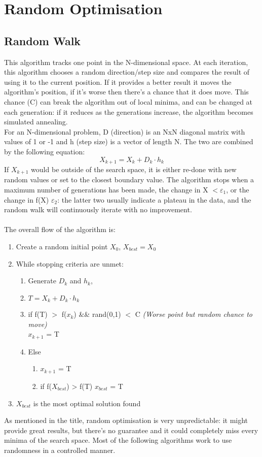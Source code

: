  \newpage
\section{Random Optimisation}

\subsection{Random Walk}
This algorithm tracks one point in the N-dimensional space. At each iteration, this algorithm chooses a random direction/step size and compares the result of using it to the current position. If it provides a better result it moves the algorithm's position, if it's worse then there's a chance that it does move. This chance (C) can break the algorithm out of local minima, and can be changed at each generation: if it reduces as the generations increase, the algorithm becomes simulated annealing. \\

For an N-dimensional problem, D (direction) is an NxN diagonal matrix with values of 1 or -1 and h (step size) is a vector of length N. The two are combined by the following equation:
\begin{equation}
    X_{k+1} = X_k + D_k \cdot h_k
\end{equation}
If $X_{k+1}$ would be outside of the search space, it is either re-done with new random values or set to the closest boundary value. The algorithm stops when a maximum number of generations has been made, the change in X $< \varepsilon_1$, or the change in f(X) $\varepsilon_2$: the latter two usually indicate a plateau in the data, and the random walk will continuously iterate with no improvement. \\ \\
The overall flow of the algorithm is:
\begin{enumerate}[label=\Alph*]
\item Create a random initial point $X_0$, $X_{best} = X_0$
\item While stopping criteria are unmet:
\begin{enumerate}[label=\arabic*]
    \item Generate $D_k$ and $h_k$, 
    \item \(T = X_k + D_k \cdot h_k\)
    \item if f(T) $>$ f($x_k$) \&\& rand(0,1) $<$ C \emph{(Worse point but random chance to move)}\\
          $x_{k+1}$ = T
    \item Else 
    \begin{enumerate}
    \item $x_{k+1}$ = T
    \item if f($X_{best}$) > f(T)
          $x_{best}$ = T
    \end{enumerate}
\end{enumerate}
\item $X_{best}$ is the most optimal solution found
\end{enumerate}
As mentioned in the title, random optimisation is very unpredictable: it might provide great results, but there's no guarantee and it could completely miss every minima of the search space. Most of the following algorithms work to use randomness in a controlled manner.